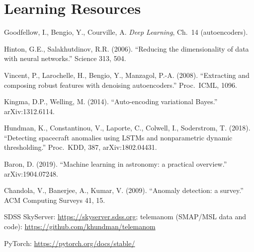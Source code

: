 \documentclass[11pt,a4paper]{article}
\begin{document}
\section*{Learning Resources}
\begin{resources}
  \item Goodfellow, I., Bengio, Y., Courville, A. \emph{Deep Learning}, Ch.~14 (autoencoders).
  \item Hinton, G.E., Salakhutdinov, R.R. (2006). ``Reducing the dimensionality of data with neural networks.'' Science 313, 504.
  \item Vincent, P., Larochelle, H., Bengio, Y., Manzagol, P.-A. (2008). ``Extracting and composing robust features with denoising autoencoders.'' Proc.\ ICML, 1096.
  \item Kingma, D.P., Welling, M. (2014). ``Auto-encoding variational Bayes.'' arXiv:1312.6114.
\end{resources}
\begin{resources}
  \item Hundman, K., Constantinou, V., Laporte, C., Colwell, I., Soderstrom, T. (2018). ``Detecting spacecraft anomalies using LSTMs and nonparametric dynamic thresholding.'' Proc.\ KDD, 387, arXiv:1802.04431.
  \item Baron, D. (2019). ``Machine learning in astronomy: a practical overview.'' arXiv:1904.07248.
  \item Chandola, V., Banerjee, A., Kumar, V. (2009). ``Anomaly detection: a survey.'' ACM Computing Surveys 41, 15.
\end{resources}
\begin{resources}
  \item SDSS SkyServer: \url{https://skyserver.sdss.org}; telemanom (SMAP/MSL data and code): \url{https://github.com/khundman/telemanom}
  \item PyTorch: \url{https://pytorch.org/docs/stable/}
\end{resources}

\evaluation
\end{document}
